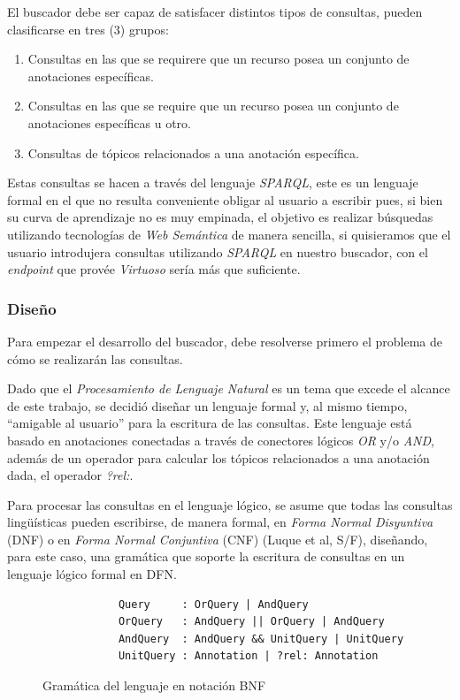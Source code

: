 \begin{itemize}
El buscador debe ser capaz de satisfacer distintos tipos de consultas, pueden clasificarse en tres (3) grupos:

\begin{enumerate}
    \item Consultas en las que se requirere que un recurso posea un conjunto de anotaciones específicas.
    \item Consultas en las que se require que un recurso posea un conjunto de anotaciones específicas u otro.
    \item Consultas de tópicos relacionados a una anotación específica.
\end{enumerate}

Estas consultas se hacen a través del lenguaje \textit{SPARQL}, este es un lenguaje formal en el que no resulta conveniente obligar al usuario a escribir pues, si bien su curva de aprendizaje no es muy empinada, el objetivo es realizar búsquedas utilizando tecnologías de \textit{Web Semántica} de manera sencilla, si quisieramos que el usuario introdujera consultas utilizando \textit{SPARQL} en nuestro buscador, con el \textit{endpoint} que provée \textit{Virtuoso} sería más que suficiente.

\subsubsection{Diseño}
Para empezar el desarrollo del buscador, debe resolverse primero el problema de cómo se realizarán las consultas.

Dado que el \textit{Procesamiento de Lenguaje Natural} es un tema que excede el alcance de este trabajo, se decidió diseñar un lenguaje formal y, al mismo tiempo, ``amigable al usuario'' para la escritura de las consultas. Este lenguaje está basado en anotaciones conectadas a través de conectores lógicos \textit{OR} y/o \textit{AND}, además de un operador para calcular los tópicos relacionados a una anotación dada, el operador \textit{?rel:}.

Para procesar las consultas en el lenguaje lógico, se asume que todas las consultas lingüísticas pueden escribirse, de manera formal, en \textit{Forma Normal Disyuntiva} (DNF) o en \textit{Forma Normal Conjuntiva} (CNF) (Luque et al, S/F), diseñando, para este caso, una gramática que soporte la escritura de consultas en un lenguaje lógico formal en DFN.

\begin{figure}[!h]
    \begin{center}
        \begin{verbatim} 
            Query     : OrQuery | AndQuery
            OrQuery   : AndQuery || OrQuery | AndQuery
            AndQuery  : AndQuery && UnitQuery | UnitQuery
            UnitQuery : Annotation | ?rel: Annotation
        \end{verbatim}
        \caption{Gramática del lenguaje en notación BNF}
        \label{BNFGrammar}
    \end{center}
\end{figure}


\end{itemize}
